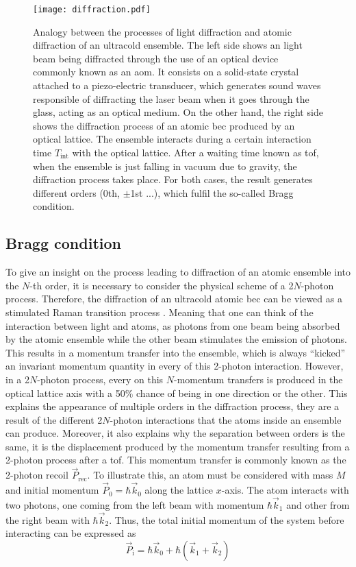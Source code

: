 \begin{figure}[!htbp]\centering
	\texttt{[image: diffraction.pdf]}
	\caption[Analogy between the processes of light diffraction and atomic diffraction of an ultracold ensemble]{Analogy between the processes of light diffraction and atomic diffraction of an ultracold ensemble. The left side shows an light beam being diffracted through the use of an optical device commonly known as an \Acf{aom}. It consists on a solid-state crystal attached to a piezo-electric transducer, which generates sound waves responsible of diffracting the laser beam when it goes through the glass, acting as an optical medium. On the other hand, the right side shows the diffraction process of an atomic \ac{bec} produced by an optical lattice. The ensemble interacts during a certain interaction time $T_{\text{int}}$ with the optical lattice. After a waiting time known as \Acf{tof}, when the ensemble is just falling in vacuum due to gravity, the diffraction process takes place. For both cases, the result generates different orders (0th, $\pm$1st ...), which fulfil the so-called Bragg condition.}\label{fig:diffraction}
\end{figure}


\subsection{Bragg condition}

To give an insight on the process leading to diffraction of an atomic ensemble into the $N$-th order, it is necessary to consider the physical scheme of a 2$N$-photon process. Therefore, the diffraction of an ultracold atomic \ac{bec} can be viewed as a stimulated Raman transition process \cite{Kozuma1999}. Meaning that one can think of the interaction between light and atoms, as photons from one beam being absorbed by the atomic ensemble while the other beam stimulates the emission of photons. This results in a momentum transfer into the ensemble, which is always ``kicked'' an invariant momentum quantity in every of this 2-photon interaction. However, in a 2$N$-photon process, every on this $N$-momentum transfers is produced in the optical lattice axis with a 50$\%$ chance of being in one direction or the other. This explains the appearance of multiple orders in the diffraction process, they are a result of the different 2$N$-photon interactions that the atoms inside an ensemble can produce. Moreover, it also explains why the separation between orders is the same, it is the displacement produced by the momentum transfer resulting from a 2-photon process after a \ac{tof}. This momentum transfer is commonly known as the 2-photon recoil $\vec{P}_\text{rec}$. To illustrate this, an atom must be considered with mass $M$ and initial momentum $\vec{P}_0 = \hbar \vec{k}_0$ along the lattice $x$-axis. The atom interacts with two photons, one coming from the left beam with momentum $\hbar \vec{k}_1$ and other from the right beam with $\hbar \vec{k}_2$. Thus, the total initial momentum of the system before interacting can be expressed as
\begin{equation}
	\vec{P}_\text{i} = \hbar \vec{k}_0 + \hbar (\vec{k}_1 + \vec{k}_2)
\end{equation}

